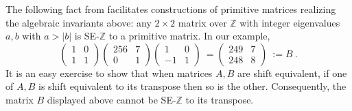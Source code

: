 \documentclass{amsart}
\theoremstyle{definition}
\theoremstyle{definition}
\newcommand{\Z}{\mathbb Z}
\numberwithin{equation}{subsection}
\begin{document}
The following fact from  \cite{BH93}
facilitates constructions of primitive matrices realizing
the algebraic invariants above:
any $2\times 2$ matrix over $\Z$ with integer eigenvalues $a,b$ with
$a>|b|$ is SE-$\Z$ to a primitive matrix.
In our example,
\[
\begin{pmatrix} 1 & 0\\ 1 &1 \end{pmatrix}
\begin{pmatrix} 256 & 7\\ 0 &1 \end{pmatrix}
\begin{pmatrix} 1 & 0\\ -1 &1 \end{pmatrix}
\ =
\begin{pmatrix} 249 & 7\\ 248 & 8 \end{pmatrix} \ := B\ .
\]
It is an easy exercise to show that when matrices
$A,B$
are shift equivalent, if one of $A,B$ is shift equivalent to its
transpose then so is the other.
Consequently, the matrix $B$ displayed above cannot be SE-$\Z$ to its
transpose.
\end{document}
